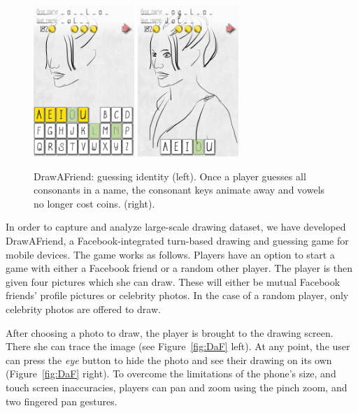 \begin{figure}
  \centering%
\includegraphics[width=1.5in]{DaF/angelina_guess1.png}
\hspace{0.1in}
\includegraphics[width=1.5in]{DaF/angelina_guess2.png}
  \caption{DrawAFriend: guessing identity (left). Once a player guesses all consonants in a name, the consonant keys animate away and vowels no longer cost coins. (right).}
  \label{fig:DaF2}
\end{figure}

In order to capture and analyze large-scale drawing dataset, we have developed DrawAFriend, a Facebook-integrated turn-based drawing and guessing game for mobile devices.  The game works as follows. Players have an option to start a game with either a Facebook friend or a random other player.  The player is then given four pictures which she can draw. These will either be mutual Facebook friends' profile pictures or  celebrity photos. In the case of a random player, only celebrity photos are offered to draw.

After choosing a photo to draw, the player is brought to the drawing screen. There she can trace the image (see Figure~\ref{fig:DaF} left). At any point, the user can press the {\em eye} button to hide the photo and see their drawing on its own (Figure~\ref{fig:DaF} right). To overcome the limitations of the phone's size, and touch screen inaccuracies, players can pan and zoom using the pinch zoom, and two fingered pan gestures.

